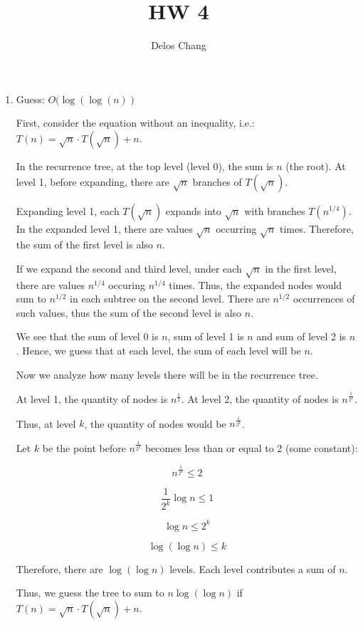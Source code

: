 \documentclass[a4paper]{report}
\title{HW 4}
\author{Delos Chang}
\date{}
\begin{document}
  \begin{enumerate}
    \item 

      Guess: $O(\log(\log(n))$

      First, consider the equation without an inequality, i.e.: $T(n) = \sqrt{n} \cdot T(\sqrt{n}) + n$.

      In the recurrence tree, at the top level (level 0), the sum is $n$ (the root). At level 1, before expanding, there are
      $\sqrt{n}$ branches of $T(\sqrt{n})$.

      Expanding level 1, each $T(\sqrt{n})$ expands into $\sqrt{n}$ with branches $T(n^{1/4})$. In the expanded
      level 1, there are values $\sqrt{n}$ occurring $\sqrt{n}$ times. Therefore, the sum of the first level is also $n$.

      If we expand the second and third level, under each $\sqrt{n}$ in the first level, there are values $n^{1/4}$ occuring $n^{1/4}$ times.
      Thus, the expanded nodes would sum to $n^{1/2}$ in each subtree on the second level. There are $n^{1/2}$ occurrences of such values,
      thus the sum of the second level is also $n$.

      We see that the sum of level 0 is $n$, sum of level 1 is $n$ and sum of level 2 is $n$. Hence, we guess that at each level, the sum of each level will be $n$. 

      Now we analyze how many levels there will be in the recurrence tree. 

      At level 1, the quantity of nodes is $n^{\frac{1}{2}}$.
      At level 2, the quantity of nodes is $n^{\frac{1}{2^{2}}}$.

      Thus, at level $k$, the quantity of nodes would be $n^{\frac{1}{2^k}}$.

      Let $k$ be the point before $n^{\frac{1}{2^k}}$ becomes less than or equal to 2 (some constant):

      $$n^{\frac{1}{2^k}} \leq 2 $$

      $$\frac{1}{2^k} \log n \leq 1 $$

      $$ \log n \leq 2^{k} $$

      $$ \log(\log n) \leq k $$

      Therefore, there are $\log(\log n)$ levels. Each level contributes a sum of $n$. 

      Thus, we guess the tree to sum to $n \log(\log n)$ if $T(n) = \sqrt{n} \cdot T(\sqrt{n}) + n$.


\end{enumerate}
\end{document}
